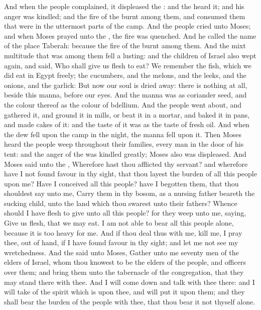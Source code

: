 \begin{biblechapter} %
 And when the people complained, it displeased the \LORD: and the \LORD heard it; and his anger was kindled; and the fire of the \LORD burnt among them, and consumed them that were in the uttermost parts of the camp.
\verse And the people cried unto Moses; and when Moses prayed unto the \LORD, the fire was quenched.
\verse And he called the name of the place Taberah: because the fire of the \LORD burnt among them.
 And the mixt multitude that was among them fell a lusting: and the children of Israel also wept again, and said, Who shall give us flesh to eat?
\verse We remember the fish, which we did eat in Egypt freely; the cucumbers, and the melons, and the leeks, and the onions, and the garlick:
\verse But now our soul is dried away: there is nothing at all, beside this manna, before our eyes.
\verse And the manna was as coriander seed, and the colour thereof as the colour of bdellium.
\verse And the people went about, and gathered it, and ground it in mills, or beat it in a mortar, and baked it in pans, and made cakes of it: and the taste of it was as the taste of fresh oil.
\verse And when the dew fell upon the camp in the night, the manna fell upon it.
\verse Then Moses heard the people weep throughout their families, every man in the door of his tent: and the anger of the \LORD was kindled greatly; Moses also was displeased.
\verse And Moses said unto the \LORD, Wherefore hast thou afflicted thy servant? and wherefore have I not found favour in thy sight, that thou layest the burden of all this people upon me?
\verse Have I conceived all this people? have I begotten them, that thou shouldest say unto me, Carry them in thy bosom, as a nursing father beareth the sucking child, unto the land which thou swarest unto their fathers?
\verse Whence should I have flesh to give unto all this people? for they weep unto me, saying, Give us flesh, that we may eat.
\verse I am not able to bear all this people alone, because it is too heavy for me.
\verse And if thou deal thus with me, kill me, I pray thee, out of hand, if I have found favour in thy sight; and let me not see my wretchedness.
\verse And the \LORD said unto Moses, Gather unto me seventy men of the elders of Israel, whom thou knowest to be the elders of the people, and officers over them; and bring them unto the tabernacle of the congregation, that they may stand there with thee.
\verse And I will come down and talk with thee there: and I will take of the spirit which is upon thee, and will put it upon them; and they shall bear the burden of the people with thee, that thou bear it not thyself alone.

\end{biblechapter}
